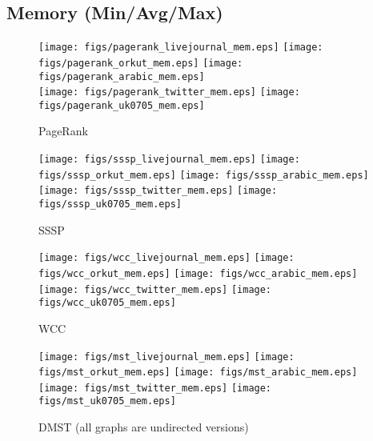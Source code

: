 \documentclass{article}
\newcommand{\bline}[1][1]{\vspace{#1\baselineskip}}
\begin{document}
\pagebreak
\subsection{Memory (Min/Avg/Max)}
\begin{figure}[!h]
  \bline[1]
  \centering
  \texttt{[image: figs/pagerank\_livejournal\_mem.eps]}\hspace{1em}%
  \texttt{[image: figs/pagerank\_orkut\_mem.eps]}\hspace{1em}%
  \texttt{[image: figs/pagerank\_arabic\_mem.eps]}\\
  \texttt{[image: figs/pagerank\_twitter\_mem.eps]}\hspace{1em}%
  \texttt{[image: figs/pagerank\_uk0705\_mem.eps]}
  \caption{PageRank}
\end{figure}

\begin{figure}[!h]
  \bline[3.5]
  \centering
  \texttt{[image: figs/sssp\_livejournal\_mem.eps]}\hspace{1em}%
  \texttt{[image: figs/sssp\_orkut\_mem.eps]}\hspace{1em}%
  \texttt{[image: figs/sssp\_arabic\_mem.eps]}\\
  \texttt{[image: figs/sssp\_twitter\_mem.eps]}\hspace{1em}%
  \texttt{[image: figs/sssp\_uk0705\_mem.eps]}
  \caption{SSSP}
\end{figure}

\begin{figure}[!h]
  \bline[3.5]
  \centering
  \texttt{[image: figs/wcc\_livejournal\_mem.eps]}\hspace{1em}%
  \texttt{[image: figs/wcc\_orkut\_mem.eps]}\hspace{1em}%
  \texttt{[image: figs/wcc\_arabic\_mem.eps]}\\
  \texttt{[image: figs/wcc\_twitter\_mem.eps]}\hspace{1em}%
  \texttt{[image: figs/wcc\_uk0705\_mem.eps]}
  \caption{WCC}
\end{figure}

\begin{figure}[!h]
  \bline[3.5]
  \centering
  \texttt{[image: figs/mst\_livejournal\_mem.eps]}\hspace{1em}%
  \texttt{[image: figs/mst\_orkut\_mem.eps]}\hspace{1em}%
  \texttt{[image: figs/mst\_arabic\_mem.eps]}\\
  \texttt{[image: figs/mst\_twitter\_mem.eps]}\hspace{1em}%
  \texttt{[image: figs/mst\_uk0705\_mem.eps]}
  \caption{DMST (all graphs are undirected versions)}
\end{figure}
\end{document}
